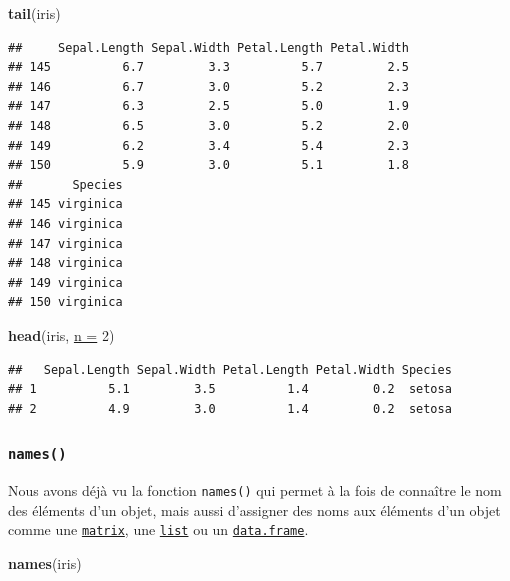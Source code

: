 \documentclass[twoside,symmetric]{book}
\newenvironment{Shaded}{}{}
\newcommand{\DataTypeTok}[1]{\underline{#1}}
\newcommand{\DecValTok}[1]{#1}
\newcommand{\KeywordTok}[1]{\textbf{#1}}
\newcommand{\NormalTok}[1]{#1}
\begin{document}
\begin{Shaded}
\begin{Highlighting}[]
\KeywordTok{tail}\NormalTok{(iris)}
\end{Highlighting}
\end{Shaded}

\begin{verbatim}
##     Sepal.Length Sepal.Width Petal.Length Petal.Width
## 145          6.7         3.3          5.7         2.5
## 146          6.7         3.0          5.2         2.3
## 147          6.3         2.5          5.0         1.9
## 148          6.5         3.0          5.2         2.0
## 149          6.2         3.4          5.4         2.3
## 150          5.9         3.0          5.1         1.8
##       Species
## 145 virginica
## 146 virginica
## 147 virginica
## 148 virginica
## 149 virginica
## 150 virginica
\end{verbatim}

\begin{Shaded}
\begin{Highlighting}[]
\KeywordTok{head}\NormalTok{(iris, }\DataTypeTok{n =} \DecValTok{2}\NormalTok{)}
\end{Highlighting}
\end{Shaded}

\begin{verbatim}
##   Sepal.Length Sepal.Width Petal.Length Petal.Width Species
## 1          5.1         3.5          1.4         0.2  setosa
## 2          4.9         3.0          1.4         0.2  setosa
\end{verbatim}

\hypertarget{l015names}{%
\subsubsection{\texorpdfstring{\texttt{names()}}{names()}}\label{l015names}}

Nous avons déjà vu la fonction \texttt{names()} qui permet à la fois de connaître le nom des éléments d'un objet, mais aussi d'assigner des noms aux éléments d'un objet comme une \protect\hyperlink{l014matrix}{\texttt{matrix}}, une \protect\hyperlink{l014list}{\texttt{list}} ou un \protect\hyperlink{l014dataframe}{\texttt{data.frame}}.

\begin{Shaded}
\begin{Highlighting}[]
\KeywordTok{names}\NormalTok{(iris)}
\end{Highlighting}
\end{Shaded}
\end{document}
